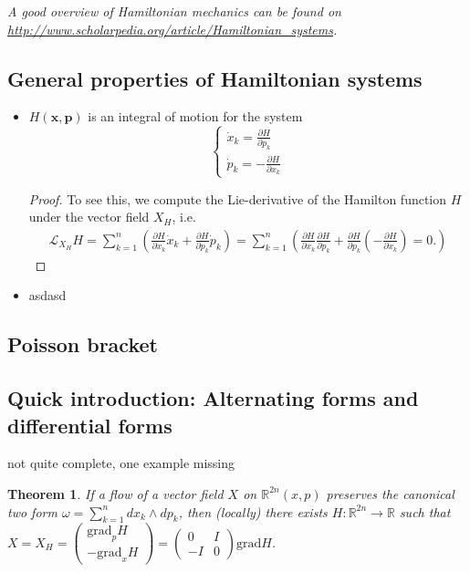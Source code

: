 \documentclass[hidelinks,a4paper, 11pt]{article}
\theoremstyle{plain}
\newtheorem{theorem}{Theorem}
\theoremstyle{break}
\theoremstyle{plain}
\theoremstyle{definition}
\begin{document}
{\textit{A good overview of Hamiltonian mechanics can be found on \url{http://www.scholarpedia.org/article/Hamiltonian_systems}.}

\subsection{General properties of Hamiltonian systems}
\begin{itemize}
	\item $H(\mathbf x,\mathbf p)$ is an integral of motion for the system
	\[
		\begin{cases}
			\dot x_k = \frac{\partial H}{\partial p_k} \\
			\dot p_k = -\frac{\partial H}{\partial x_k}
		\end{cases} 
	\]
	\begin{proof}
		To see this, we compute the Lie-derivative of the Hamilton function $H$ under the vector field $X_H$, i.e. 
		\begin{align*}
			\mathcal L_{X_H}H = \sum^n_{k=1}\left( 
				\frac{\partial H}{\partial x_k}\dot x_k + \frac{\partial H}{\partial p_k}\dot p_k
			\right) = 
			\sum^n_{k=1} \left( 
				\frac{\partial H}{\partial x_k} \frac{\partial H}{\partial p_k} + \frac{\partial H}{\partial p_k}(- \frac{\partial H}{\partial x_k}) = 0.
			\right)
		\end{align*}
	\end{proof}

	\item asdasd
\end{itemize}

\subsection{Poisson bracket}

\subsection{Quick introduction: Alternating forms and differential forms}



not quite complete, one example missing 


\begin{theorem}
	If a flow of a vector field $X$ on $\mathbb R^{2n}(x,p)$ preserves the canonical two form $\omega = \sum^n_{k=1} dx_k \land dp_k$, then (locally) there exists $H: \mathbb R^{2n} \to \mathbb R$ such that $X = X_H = \begin{pmatrix}
	\mathrm{grad}_pH \\ \mathrm{-grad}_xH
	\end{pmatrix} = \begin{pmatrix}
	0 & I \\ -I & 0
	\end{pmatrix} \mathrm{grad} H$.
\end{theorem}

}
\end{document}

